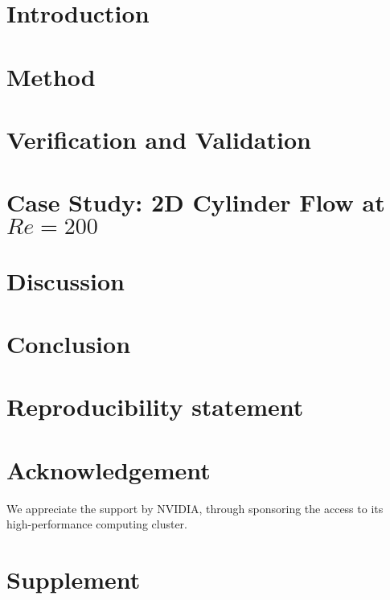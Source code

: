\documentclass[5p, twocolumn, times, sort&compress]{elsarticle}
\begin{document}
    \section{Introduction}
    

    \section{Method}
    

    \section{Verification and Validation}
    
    

    \section{Case Study: 2D Cylinder Flow at $Re=\num{200}$}\label{sec:case-study}
    

    \section{Discussion}
    

    \section{Conclusion}
    

    \section{Reproducibility statement}
    

    \section*{Acknowledgement}
    We appreciate the support by NVIDIA, through sponsoring the access to its high-performance computing cluster.

    

    \newpage
    \appendix
    \section{Supplement}
    
\end{document}
